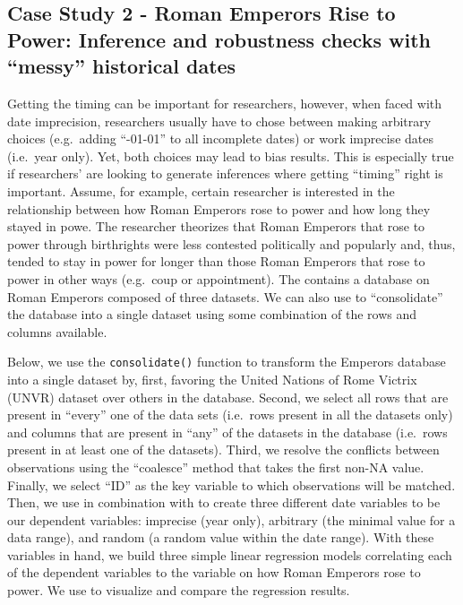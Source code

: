 \documentclass[
]{jss}
\begin{document}
\hypertarget{case-study-2---roman-emperors-rise-to-power-inference-and-robustness-checks-with-messy-historical-dates}{%
\subsection{Case Study 2 - Roman Emperors Rise to Power: Inference and
robustness checks with ``messy'' historical
dates}\label{case-study-2---roman-emperors-rise-to-power-inference-and-robustness-checks-with-messy-historical-dates}}

Getting the timing can be important for researchers, however, when faced
with date imprecision, researchers usually have to chose between making
arbitrary choices (e.g.~adding ``-01-01'' to all incomplete dates) or
work imprecise dates (i.e.~year only). Yet, both choices may lead to
bias results. This is especially true if researchers' are looking to
generate inferences where getting ``timing'' right is important. Assume,
for example, certain researcher is interested in the relationship
between how Roman Emperors rose to power and how long they stayed in
powe. The researcher theorizes that Roman Emperors that rose to power
through birthrights were less contested politically and popularly and,
thus, tended to stay in power for longer than those Roman Emperors that
rose to power in other ways (e.g.~coup or appointment). The
 contains a database on Roman Emperors composed of three
datasets. We can also use  to ``consolidate'' the database
into a single dataset using some combination of the rows and columns
available.

Below, we use the \texttt{consolidate()} function to transform the
Emperors database into a single dataset by, first, favoring the United
Nations of Rome Victrix (UNVR) dataset over others in the database.
Second, we select all rows that are present in ``every'' one of the data
sets (i.e.~rows present in all the datasets only) and columns that are
present in ``any'' of the datasets in the database (i.e.~rows present in
at least one of the datasets). Third, we resolve the conflicts between
observations using the ``coalesce'' method that takes the first non-NA
value. Finally, we select ``ID'' as the key variable to which
observations will be matched. Then, we use  in combination
with  to create three different date variables to be our
dependent variables: imprecise (year only), arbitrary (the minimal value
for a data range), and random (a random value within the date range).
With these variables in hand, we build three simple linear regression
models correlating each of the dependent variables to the variable on
how Roman Emperors rose to power. We use  to visualize
and compare the regression results.
\end{document}
